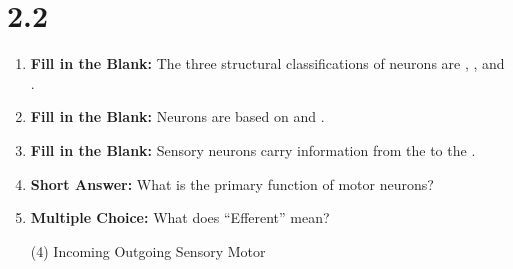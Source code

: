 \section*{2.2}
\begin{enumerate}[label=\textbf{Q2.2.\arabic*}]

      \item \textbf{Fill in the Blank:} The three structural classifications of neurons are \underline{\hspace{3cm}}, \underline{\hspace{3cm}}, and \underline{\hspace{3cm}}. \\



      \item \textbf{Fill in the Blank:} Neurons are based on \underline{\hspace{3cm}} and \underline{\hspace{3cm}}. \\


      \item \textbf{Fill in the Blank:} Sensory neurons carry information from the \underline{\hspace{3cm}} to the \underline{\hspace{3cm}}. \\

      \item \textbf{Short Answer:} What is the primary function of motor neurons? \\

      \item \textbf{Multiple Choice:} What does ``Efferent'' mean?
            \begin{tasks}[label=(\Alph*), label-width=1.5em, item-indent=1.7em](4)
                  \task Incoming
                  \task Outgoing
                  \task Sensory
                  \task Motor
            \end{tasks}

\end{enumerate}
\squigglyline


